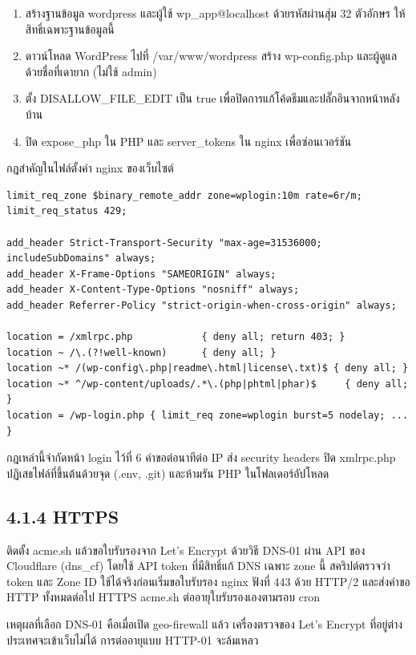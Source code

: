 \begin{enumerate}
\def\labelenumi{\arabic{enumi}.}
\tightlist
\item
  สร้างฐานข้อมูล wordpress และผู้ใช้ wp\_app@localhost ด้วยรหัสผ่านสุ่ม 32 ตัวอักษร ให้สิทธิ์เฉพาะฐานข้อมูลนี้
\item
  ดาวน์โหลด WordPress ไปที่ /var/www/wordpress สร้าง wp-config.php และผู้ดูแลด้วยชื่อที่เดายาก (ไม่ใช้ admin)
\item
  ตั้ง DISALLOW\_FILE\_EDIT เป็น true เพื่อปิดการแก้โค้ดธีมและปลั๊กอินจากหน้าหลังบ้าน
\item
  ปิด expose\_php ใน PHP และ server\_tokens ใน nginx เพื่อซ่อนเวอร์ชัน
\end{enumerate}

กฎสำคัญในไฟล์ตั้งค่า nginx ของเว็บไซต์

\begin{Verbatim}[breaklines,breakanywhere,fontsize=\small,frame=single,framesep=6pt]
limit_req_zone $binary_remote_addr zone=wplogin:10m rate=6r/m;
limit_req_status 429;

add_header Strict-Transport-Security "max-age=31536000; includeSubDomains" always;
add_header X-Frame-Options "SAMEORIGIN" always;
add_header X-Content-Type-Options "nosniff" always;
add_header Referrer-Policy "strict-origin-when-cross-origin" always;

location = /xmlrpc.php            { deny all; return 403; }
location ~ /\.(?!well-known)      { deny all; }
location ~* /(wp-config\.php|readme\.html|license\.txt)$ { deny all; }
location ~* ^/wp-content/uploads/.*\.(php|phtml|phar)$     { deny all; }
location = /wp-login.php { limit_req zone=wplogin burst=5 nodelay; ... }
\end{Verbatim}

กฎเหล่านี้จำกัดหน้า login ไว้ที่ 6 คำขอต่อนาทีต่อ IP ส่ง security headers ปิด xmlrpc.php ปฏิเสธไฟล์ที่ขึ้นต้นด้วยจุด (.env, .git) และห้ามรัน PHP ในโฟลเดอร์อัปโหลด

\subsection*{4.1.4 HTTPS}

ติดตั้ง acme.sh แล้วขอใบรับรองจาก Let's Encrypt ด้วยวิธี DNS-01 ผ่าน API ของ Cloudflare (dns\_cf) โดยใช้ API token ที่มีสิทธิ์แก้ DNS เฉพาะ zone นี้ สคริปต์ตรวจว่า token และ Zone ID ใช้ได้จริงก่อนเริ่มขอใบรับรอง nginx ฟังที่ 443 ด้วย HTTP/2 และส่งคำขอ HTTP ทั้งหมดต่อไป HTTPS acme.sh ต่ออายุใบรับรองเองตามรอบ cron

เหตุผลที่เลือก DNS-01 คือเมื่อเปิด geo-firewall แล้ว เครื่องตรวจของ Let's Encrypt ที่อยู่ต่างประเทศจะเข้าเว็บไม่ได้ การต่ออายุแบบ HTTP-01 จะล้มเหลว

